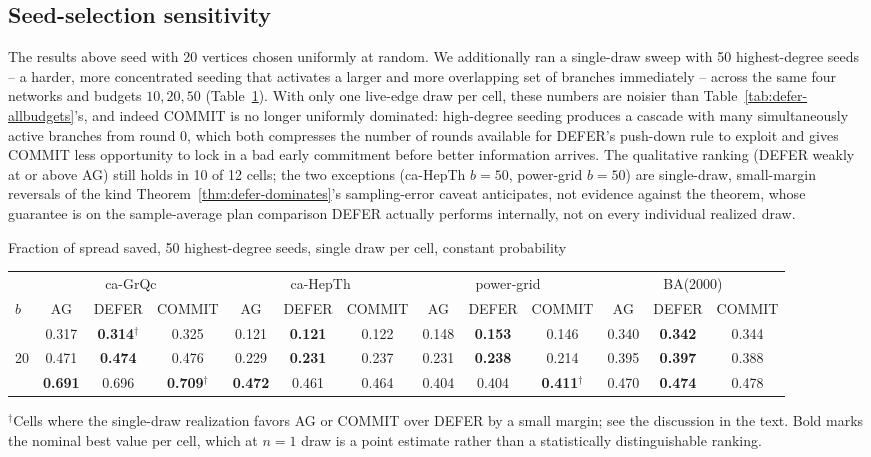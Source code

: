 \documentclass[ijoc,sglanonrev]{informs4}
\begin{document}
\subsection{Seed-selection sensitivity}\label{sec:seed-sensitivity}

The results above seed with 20 vertices chosen uniformly at random. We
additionally ran a single-draw sweep with 50 highest-degree seeds -- a
harder, more concentrated seeding that activates a larger and more
overlapping set of branches immediately -- across the same four networks
and budgets $10,20,50$ (Table~\ref{tab:defer-degree-seeds}). With only one
live-edge draw per cell, these numbers are noisier than
Table~\ref{tab:defer-allbudgets}'s, and indeed COMMIT is no longer
uniformly dominated: high-degree seeding produces a cascade with many
simultaneously active branches from round 0, which both compresses the
number of rounds available for DEFER's push-down rule to exploit and gives
COMMIT less opportunity to lock in a bad early commitment before better
information arrives. The qualitative ranking (DEFER weakly at or above AG)
still holds in 10 of 12 cells; the two exceptions
(ca-HepTh $b=50$, power-grid $b=50$) are single-draw, small-margin
reversals of the kind Theorem~\ref{thm:defer-dominates}'s sampling-error
caveat anticipates, not evidence against the theorem, whose guarantee is on
the sample-average plan comparison DEFER actually performs internally, not
on every individual realized draw.

\begin{table}[h]
\TABLE
{Fraction of spread saved, 50 highest-degree seeds, single draw per cell, constant probability\label{tab:defer-degree-seeds}}
{\begin{tabular}{@{}lcccccccccccc@{}}
\hline
\up & \multicolumn{3}{c}{ca-GrQc} & \multicolumn{3}{c}{ca-HepTh} & \multicolumn{3}{c}{power-grid} & \multicolumn{3}{c}{BA(2000)} \\
$b$ & AG & DEFER & COMMIT & AG & DEFER & COMMIT & AG & DEFER & COMMIT & AG & DEFER & COMMIT \\
\hline
\up 10 & 0.317 & \textbf{0.314}$^\dagger$ & 0.325 & 0.121 & \textbf{0.121} & 0.122 & 0.148 & \textbf{0.153} & 0.146 & 0.340 & \textbf{0.342} & 0.344 \\
20 & 0.471 & \textbf{0.474} & 0.476 & 0.229 & \textbf{0.231} & 0.237 & 0.231 & \textbf{0.238} & 0.214 & 0.395 & \textbf{0.397} & 0.388 \\
\down 50 & \textbf{0.691} & 0.696 & \textbf{0.709}$^\dagger$ & \textbf{0.472} & 0.461 & 0.464 & 0.404 & 0.404 & \textbf{0.411}$^\dagger$ & 0.470 & \textbf{0.474} & 0.478 \\
\hline
\end{tabular}}
{$^\dagger$Cells where the single-draw realization favors AG or COMMIT
over DEFER by a small margin; see the discussion in the text. Bold marks
the nominal best value per cell, which at $n=1$ draw is a point estimate
rather than a statistically distinguishable ranking.}
\end{table}
\end{document}

